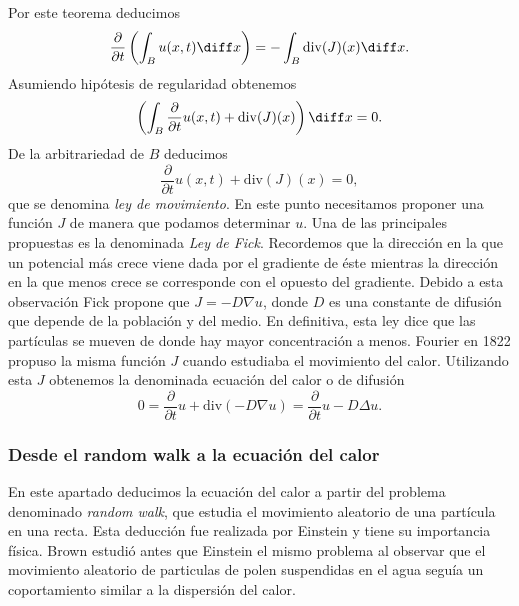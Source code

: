 \documentclass{article}
\begin{document}
Por este teorema deducimos
\begin{equation}
  \label{eq:mov:2}
  \frac{\partial}{\partial t} \left( \int_B u(x,t) \diff x\right) = - \int_{B} \mathrm{div}(J)(x) \diff x.
\end{equation}
Asumiendo hipótesis de regularidad obtenemos
\begin{equation}
  \label{eq:mov:3}
  \left( \int_B \frac{\partial}{\partial t} u(x,t) + \mathrm{div}(J)(x) \right) \diff x = 0.
\end{equation}
De la arbitrariedad de $B$ deducimos
\begin{equation}
  \label{eq:mov:4}
  \frac{\partial}{\partial t} u(x,t) + \mathrm{div}(J)(x) = 0,
\end{equation}
que se denomina \emph{ley de movimiento}. En este punto necesitamos proponer una función $J$ de
manera que podamos determinar $u$. Una de las principales propuestas es la denominada \emph{Ley de
  Fick}. Recordemos que la dirección en la que un potencial más crece viene dada por el gradiente de
éste mientras la dirección en la que menos crece se corresponde con el opuesto del gradiente. Debido
a esta observación Fick propone que $J = - D \nabla u$, donde $D$ es una constante de difusión que
depende de la población y del medio. En definitiva, esta ley dice que las partículas se mueven de
donde hay mayor concentración a menos. Fourier en 1822 propuso la misma función $J$ cuando estudiaba
el movimiento del calor. Utilizando esta $J$ obtenemos la denominada ecuación del calor o de
difusión
\begin{equation}
  \label{eq:mov:calor}
  0 = \frac{\partial}{\partial t}u + \mathrm{div}(-D \nabla u) = \frac{\partial}{\partial t}u - D \Delta u.
\end{equation}

\subsubsection{Desde el random walk a la ecuación del calor}

En este apartado deducimos la ecuación del calor a partir del problema denominado \emph{random
  walk}, que estudia el movimiento aleatorio de una partícula en una recta. Esta deducción fue
realizada por Einstein y tiene su importancia física. Brown estudió antes que Einstein el mismo
problema al observar que el movimiento aleatorio de particulas de polen suspendidas en el agua
seguía un coportamiento similar a la dispersión del calor.
\end{document}
